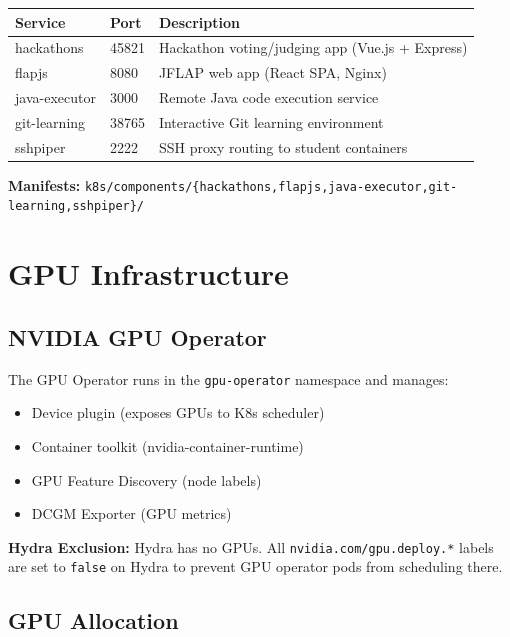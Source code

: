 \documentclass[11pt,a4paper]{article}
\begin{document}
\begin{table}[H]
\centering
\begin{tabular}{llp{6cm}}
\toprule
\textbf{Service} & \textbf{Port} & \textbf{Description} \\
\midrule
hackathons & 45821 & Hackathon voting/judging app (Vue.js + Express) \\
flapjs & 8080 & JFLAP web app (React SPA, Nginx) \\
java-executor & 3000 & Remote Java code execution service \\
git-learning & 38765 & Interactive Git learning environment \\
sshpiper & 2222 & SSH proxy routing to student containers \\
\bottomrule
\end{tabular}
\end{table}

\textbf{Manifests:} \texttt{k8s/components/\{hackathons,flapjs,java-executor,git-learning,sshpiper\}/}

\section{GPU Infrastructure}

\subsection{NVIDIA GPU Operator}

The GPU Operator runs in the \texttt{gpu-operator} namespace and manages:
\begin{itemize}[nosep]
    \item Device plugin (exposes GPUs to K8s scheduler)
    \item Container toolkit (nvidia-container-runtime)
    \item GPU Feature Discovery (node labels)
    \item DCGM Exporter (GPU metrics)
\end{itemize}

\begin{infobox}
\textbf{Hydra Exclusion:} Hydra has no GPUs. All \texttt{nvidia.com/gpu.deploy.*} labels are set to \texttt{false} on Hydra to prevent GPU operator pods from scheduling there.
\end{infobox}

\subsection{GPU Allocation}
\end{document}
